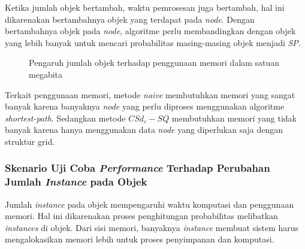 \tab Ketika jumlah objek bertambah, waktu pemrosesan juga bertambah, hal ini dikarenakan bertambahnya objek yang terdapat pada \textit{node}. Dengan bertambahnya objek pada \textit{node}, algoritme perlu membandingkan dengan objek yang lebih banyak untuk mencari probabilitas masing-masing objek menjadi \textit{SP}.

\begin{figure}[H]
	\caption{Pengaruh jumlah objek terhadap penggunaan memori dalam satuan megabita}\label{fig:uji-n-mem}
\end{figure}

\tab Terkait penggunaan memori, metode \textit{naive} membutuhkan memori yang sangat banyak karena banyaknya \textit{node} yang perlu diproses menggunakan algoritme \textit{shortest-path}. Sedangkan metode $ CSd_\varepsilon-SQ$ membutuhkan memori yang tidak banyak karena hanya menggunakan data \textit{node} yang diperlukan saja dengan struktur grid.

\subsubsection{Skenario Uji Coba \textit{Performance} Terhadap Perubahan Jumlah \textit{Instance} pada Objek}
\tab Jumlah \textit{instance} pada objek mempengaruhi waktu komputasi dan penggunaan memori. Hal ini dikarenakan proses penghitungan probabilitas melibatkan \textit{instances} di objek. Dari sisi memori, banyaknya \textit{instance} membuat sistem harus mengalokasikan memori lebih untuk proses penyimpanan dan komputasi.

